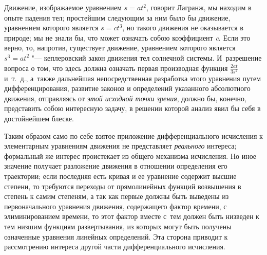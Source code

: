 Движение, изображаемое уравнением $s=at^2$, говорит Лагранж, мы находим в опыте
падения тел; простейшим следующим за ним было бы движение, уравнением которого
является $s=ct^3$, но такого движения не оказывается в природе; мы не знали бы,
что может означать собою коэффициент {\em c}. Если это верно, то, напротив,
существует движение, уравнением которого является $s^3=at^2$ "--- кеплеровский
закон движения тел солнечной системы. И~разрешение вопроса о том, что здесь
должна означать первая производная функция $\frac{2at}{3s^2}$ и~т.~д., а~также
дальнейшая непосредственная разработка этого уравнения путем дифференцирования,
развитие законов и определений указанного абсолютного движения, отправляясь от
{\em этой исходной точки зрения}, должно бы, конечно, представить собою
интересную задачу, в решении которой анализ явил бы себя в достойнейшем блеске.

Таким образом само по себе взятое приложение дифференциального исчисления
к элементарным уравнениям движения не представляет {\em реального} интереса;
формальный же интерес проистекает из общего механизма исчисления. Но иное
значение получает разложение движения в отношении определения его траектории;
если последняя есть кривая и ее уравнение содержит высшие степени, то требуются
переходы от прямолинейных функций возвышения в степень к самим степеням, а так
как первые должны быть выведены из первоначального уравнения движения,
содержащего фактор времени, с элиминированием времени, то этот фактор вместе
с~тем должен быть низведен к тем низшим функциям развертывания, из которых
могут быть получены означенные уравнения линейных определений. Эта сторона
приводит к рассмотрению интереса другой части дифференциального исчисления.

